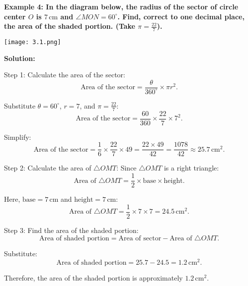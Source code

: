 \begin{flushleft}
	\textbf{Example 4: In the diagram below, the radius of the sector of circle center $O$ is $7 \, \text{cm}$ and $\angle MON = 60^\circ$. Find, correct to one decimal place, the area of the shaded portion. (Take $\pi = \frac{22}{7}$).}
	
	\begin{center}
		\texttt{[image: 3.1.png]}
		
	\end{center}
	
	\vspace{0.5cm}
	\textbf{Solution:}
	\vspace{0.5cm}
	
	Step 1: Calculate the area of the sector:
	\[
	\text{Area of the sector} = \frac{\theta}{360^\circ} \times \pi r^2.
	\]
	
	Substitute $\theta = 60^\circ$, $r = 7$, and $\pi = \frac{22}{7}$:
	\[
	\text{Area of the sector} = \frac{60}{360} \times \frac{22}{7} \times 7^2.
	\]
	
	Simplify:
	\[
	\text{Area of the sector} = \frac{1}{6} \times \frac{22}{7} \times 49 = \frac{22 \times 49}{42} = \frac{1078}{42} \approx 25.7 \, \text{cm}^2.
	\]
	
	Step 2: Calculate the area of $\triangle OMT$:
	Since $\triangle OMT$ is a right triangle:
	\[
	\text{Area of } \triangle OMT = \frac{1}{2} \times \text{base} \times \text{height}.
	\]
	
	Here, $\text{base} = 7 \, \text{cm}$ and $\text{height} = 7 \, \text{cm}$:
	\[
	\text{Area of } \triangle OMT = \frac{1}{2} \times 7 \times 7 = 24.5 \, \text{cm}^2.
	\]
	
	Step 3: Find the area of the shaded portion:
	\[
	\text{Area of shaded portion} = \text{Area of sector} - \text{Area of } \triangle OMT.
	\]
	
	Substitute:
	\[
	\text{Area of shaded portion} = 25.7 - 24.5 = 1.2 \, \text{cm}^2.
	\]
	
	Therefore, the area of the shaded portion is approximately $1.2 \, \text{cm}^2$.
\end{flushleft}